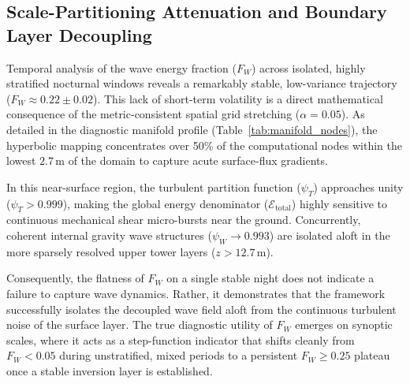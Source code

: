 \subsection{Scale-Partitioning Attenuation and Boundary Layer Decoupling}
\label{sec:results:attenuation}

Temporal analysis of the wave energy fraction ($F_W$) across isolated, highly stratified nocturnal windows reveals a remarkably stable, low-variance trajectory ($F_W \approx 0.22 \pm 0.02$). This lack of short-term volatility is a direct mathematical consequence of the metric-consistent spatial grid stretching ($\alpha = 0.05$). As detailed in the diagnostic manifold profile (Table~\ref{tab:manifold_nodes}), the hyperbolic mapping concentrates over 50\% of the computational nodes within the lowest $2.7\,\text{m}$ of the domain to capture acute surface-flux gradients.

In this near-surface region, the turbulent partition function ($\psi_T$) approaches unity ($\psi_T > 0.999$), making the global energy denominator ($\mathcal{E}_{\mathrm{total}}$) highly sensitive to continuous mechanical shear micro-bursts near the ground. Concurrently, coherent internal gravity wave structures ($\psi_W \rightarrow 0.993$) are isolated aloft in the more sparsely resolved upper tower layers ($z > 12.7\,\text{m}$).

Consequently, the flatness of $F_W$ on a single stable night does not indicate a failure to capture wave dynamics. Rather, it demonstrates that the framework successfully isolates the decoupled wave field aloft from the continuous turbulent noise of the surface layer. The true diagnostic utility of $F_W$ emerges on synoptic scales, where it acts as a step-function indicator that shifts cleanly from $F_W < 0.05$ during unstratified, mixed periods to a persistent $F_W \ge 0.25$ plateau once a stable inversion layer is established.